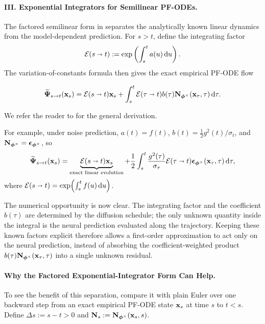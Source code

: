 \paragraph{III. Exponential Integrators for Semilinear PF-ODEs.}
The factored semilinear form in  separates
the analytically known linear dynamics from the model-dependent prediction.
For $s>t$, define the integrating factor
\[
\mathcal{E}(s\shortrightarrow t)
:=
\exp\left(
\int_s^t a(u)\mathop{}\!\mathrm{d} u
\right).
\]
The variation-of-constants formula then gives the exact empirical PF-ODE flow
\begin{mdframed}
\begin{equation}
\label{eq:factored-variation-of-constants}
\widetilde{{\bm{\Psi}}}_{s\to t}({\mathbf{x}}_s)
=
\mathcal{E}(s\shortrightarrow t){\mathbf{x}}_s
+
\int_s^t
\mathcal{E}(\tau\shortrightarrow t)
b(\tau)
{\mathbf{N}}_{\bm{\phi}^\times}({\mathbf{x}}_\tau,\tau)
\mathop{}\!\mathrm{d}\tau .
\end{equation}
\end{mdframed}
We refer the reader to  for the general derivation.

For example, under noise prediction,
$a(t)=f(t)$,
$b(t)=\tfrac{1}{2}g^2(t)/\sigma_t$, and
${\mathbf{N}}_{\bm{\phi}^\times}={\bm{\epsilon}}_{\bm{\phi}^\times}$, so
\begin{equation}
\label{eq:variation_of_constants}
\widetilde{{\bm{\Psi}}}_{s\to t}({\mathbf{x}}_s)
=
\underbrace{
\mathcal{E}(s\shortrightarrow t){\mathbf{x}}_s
}_{\text{exact linear evolution}}
+
\frac{1}{2}
\int_s^t
\frac{g^2(\tau)}{\sigma_\tau}
\mathcal{E}(\tau\shortrightarrow t)
{\bm{\epsilon}}_{\bm{\phi}^\times}({\mathbf{x}}_\tau,\tau)
\mathop{}\!\mathrm{d}\tau,
\end{equation}
where
$\mathcal{E}(s\shortrightarrow t)
=
\exp\!\left(\int_s^t f(u)\mathop{}\!\mathrm{d} u\right)$.

The numerical opportunity is now clear. The integrating factor and the
coefficient $b(\tau)$ are determined by the diffusion schedule; the only
unknown quantity inside the integral is the neural prediction evaluated along
the trajectory. Keeping these known factors explicit therefore allows a
first-order approximation to act only on the neural prediction, instead of
absorbing the coefficient-weighted product
$b(\tau){\mathbf{N}}_{\bm{\phi}^\times}({\mathbf{x}}_\tau,\tau)$ into a single unknown
residual.

\paragraph{Why the Factored Exponential-Integrator Form Can Help.}
To see the benefit of this separation, compare it with plain Euler over one
backward step from an exact empirical PF-ODE state ${\mathbf{x}}_s$ at time $s$ to
$t<s$. Define $\Delta s:=s-t>0$ and
${\mathbf{N}}_s:={\mathbf{N}}_{\bm{\phi}^\times}({\mathbf{x}}_s,s)$.

